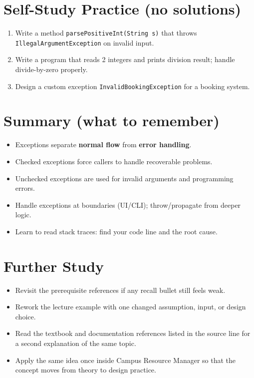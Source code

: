\documentclass[11pt]{article}
\begin{document}
\section{Self-Study Practice (no solutions)}
\begin{enumerate}
  \item Write a method \texttt{parsePositiveInt(String s)} that throws \texttt{IllegalArgumentException} on invalid input.
  \item Write a program that reads 2 integers and prints division result; handle divide-by-zero properly.
  \item Design a custom exception \texttt{InvalidBookingException} for a booking system.
\end{enumerate}

\section{Summary (what to remember)}
\begin{itemize}
  \item Exceptions separate \textbf{normal flow} from \textbf{error handling}.
  \item Checked exceptions force callers to handle recoverable problems.
  \item Unchecked exceptions are used for invalid arguments and programming errors.
  \item Handle exceptions at boundaries (UI/CLI); throw/propagate from deeper logic.
  \item Learn to read stack traces: find your code line and the root cause.
\end{itemize}

\section{Further Study}
\begin{itemize}
  \item Revisit the prerequisite references if any recall bullet still feels weak.
  \item Rework the lecture example with one changed assumption, input, or design choice.
  \item Read the textbook and documentation references listed in the source line for a second explanation of the same topic.
  \item Apply the same idea once inside Campus Resource Manager so that the concept moves from theory to design practice.
\end{itemize}
\notesources{\OOPSUnitIIISources}
\end{document}
